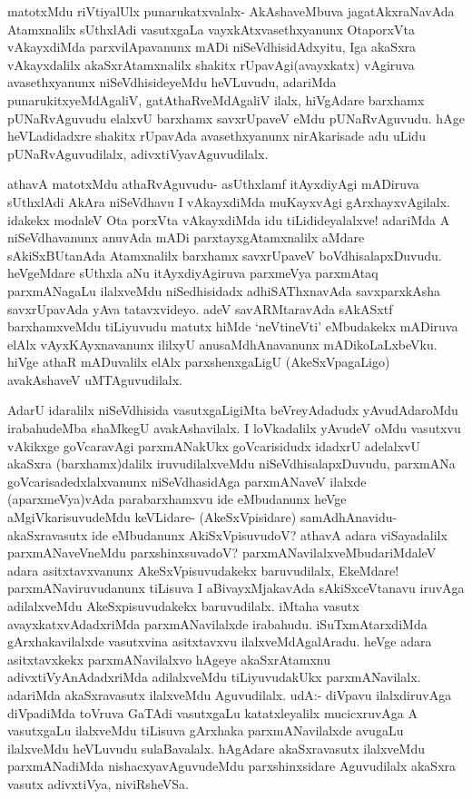 \begin{artha}
matotxMdu riVtiyalUlx punarukatxvalalx- AkAshaveMbuva jagatAkxraNavAda Atamxnalilx sUthxlAdi vasutxgaLa vayxkAtxvasethxyanunx OtaporxVta vAkayxdiMda parxvilApavanunx mADi niSeVdhisidAdxyitu, Iga akaSxra vAkayxdalilx akaSxrAtamxnalilx shakitx rUpavAgi(avayxkatx) vAgiruva avasethxyanunx niSeVdhisideyeMdu heVLuvudu, adariMda punarukitxyeMdAgaliV, gatAthaRveMdAgaliV ilalx, hiVgAdare barxhamx pUNaRvAguvudu elalxvU barxhamx savxrUpaveV eMdu pUNaRvAguvudu. hAge heVLadidadxre shakitx rUpavAda avasethxyanunx nirAkarisade adu uLidu pUNaRvAguvudilalx, adivxtiVyavAguvudilalx. 
\end{artha}

\begin{artha}%
athavA matotxMdu athaRvAguvudu- asUthxlamf itAyxdiyAgi mADiruva sUthxlAdi AkAra niSeVdhavu I vAkayxdiMda muKayxvAgi gArxhayxvAgilalx. idakekx modaleV Ota porxVta vAkayxdiMda idu tiLidideyalalxve! adariMda A niSeVdhavanunx anuvAda mADi parxtayxgAtamxnalilx aMdare sAkiSxBUtanAda Atamxnalilx barxhamx savxrUpaveV boVdhisalapxDuvudu. heVgeMdare sUthxla aNu itAyxdiyAgiruva parxmeVya parxmAtaq parxmANagaLu ilalxveMdu niSedhisidadx adhiSAThxnavAda savxparxkAsha savxrUpavAda yAva tatavxvideyo. adeV savARMtaravAda sAkASxtf barxhamxveMdu tiLiyuvudu matutx hiMde `neVtineVti' eMbudakekx mADiruva elAlx vAyxKAyxnavanunx ililxyU anusaMdhAnavanunx mADikoLaLxbeVku. hiVge athaR mADuvalilx elAlx parxshenxgaLigU (AkeSxVpagaLigo) avakAshaveV uMTAguvudilalx.
\end{artha}

\begin{artha}
AdarU idaralilx niSeVdhisida vasutxgaLigiMta beVreyAdadudx yAvudAdaroMdu irabahudeMba shaMkegU avakAshavilalx. I loVkadalilx yAvudeV oMdu vasutxvu vAkikxge goVcaravAgi parxmANakUkx goVcarisidudx idadxrU adelalxvU akaSxra (barxhamx)dalilx iruvudilalxveMdu niSeVdhisalapxDuvudu, parxmANa goVcarisadedxlalxvanunx niSeVdhasidAga parxmANaveV ilalxde (aparxmeVya)vAda parabarxhamxvu ide eMbudanunx heVge aMgiVkarisuvudeMdu keVLidare- (AkeSxVpisidare) samAdhAnavidu- akaSxravasutx ide eMbudanunx AkiSxVpisuvudoV? athavA adara viSayadalilx parxmANaveVneMdu parxshinxsuvadoV? parxmANavilalxveMbudariMdaleV adara asitxtavxvanunx AkeSxVpisuvudakekx baruvudilalx, EkeMdare! parxmANaviruvudanunx tiLisuva I aBivayxMjakavAda sAkiSxceVtanavu iruvAga adilalxveMdu AkeSxpisuvudakekx baruvudilalx. iMtaha vasutx avayxkatxvAdadxriMda parxmANavilalxde irabahudu. iSuTxmAtarxdiMda gArxhakavilalxde vasutxvina asitxtavxvu ilalxveMdAgalAradu. heVge adara asitxtavxkekx parxmANavilalxvo hAgeye akaSxrAtamxnu adivxtiVyAnAdadxriMda adilalxveMdu tiLiyuvudakUkx parxmANavilalx. adariMda akaSxravasutx ilalxveMdu Aguvudilalx. udA:- diVpavu ilalxdiruvAga diVpadiMda toVruva GaTAdi vasutxgaLu katatxleyalilx mucicxruvAga  A vasutxgaLu ilalxveMdu tiLisuva gArxhaka parxmANavilalxde avugaLu ilalxveMdu heVLuvudu sulaBavalalx. hAgAdare akaSxravasutx ilalxveMdu parxmANadiMda nishacxyavAguvudeMdu parxshinxsidare Aguvudilalx akaSxra vasutx adivxtiVya, niviRsheVSa. 
\end{artha}%

